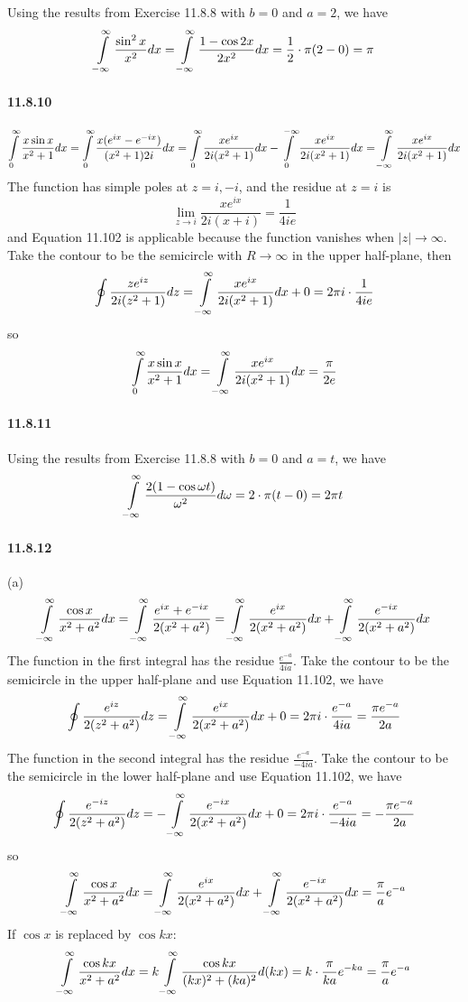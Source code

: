 \documentclass[a4paper]{article}
\begin{document}
Using the results from Exercise 11.8.8 with $b=0$ and $a=2$, we have
\[
\int\displaylimits_{-\infty}^\infty\frac{\sin^2x}{x^2}dx=\int\displaylimits_{-\infty}^\infty\frac{1-\cos2x}{2x^2}dx=\frac{1}{2}\cdot\pi(2-0)=\pi
\]

\paragraph{11.8.10}
\[
\int\displaylimits_0^\infty\frac{x\sin x}{x^2+1}dx=\int\displaylimits_0^\infty\frac{x(e^{ix}-e^{-ix})}{(x^2+1)2i}dx=\int\displaylimits_0^\infty\frac{xe^{ix}}{2i(x^2+1)}dx-\int\displaylimits_0^{-\infty}\frac{xe^{ix}}{2i(x^2+1)}dx=\int\displaylimits_{-\infty}^\infty\frac{xe^{ix}}{2i(x^2+1)}dx
\]
The function has simple poles at $z=i,-i$, and the residue at $z=i$ is
\[
\lim_{z\to i}\frac{xe^{ix}}{2i(x+i)}=\frac{1}{4ie}
\]
and Equation 11.102 is applicable because the function vanishes when $|z|\to\infty$. Take the contour to be the semicircle with $R\to\infty$ in the upper half-plane, then
\[
\oint\frac{ze^{iz}}{2i(z^2+1)}dz=\int\displaylimits_{-\infty}^\infty\frac{xe^{ix}}{2i(x^2+1)}dx+0=2\pi i\cdot\frac{1}{4ie}
\]
so
\[
\int\displaylimits_0^\infty\frac{x\sin x}{x^2+1}dx=\int\displaylimits_{-\infty}^\infty\frac{xe^{ix}}{2i(x^2+1)}dx=\frac{\pi}{2e}
\]

\paragraph{11.8.11}
Using the results from Exercise 11.8.8 with $b=0$ and $a=t$, we have
\[
\int\displaylimits_{-\infty}^\infty\frac{2(1-\cos\omega t)}{\omega^2}d\omega=2\cdot\pi(t-0)=2\pi t
\]

\paragraph{11.8.12}
(a)
\[
\int\displaylimits_{-\infty}^\infty\frac{\cos x}{x^2+a^2}dx=\int\displaylimits_{-\infty}^\infty\frac{e^{ix}+e^{-ix}}{2(x^2+a^2)}=\int\displaylimits_{-\infty}^\infty\frac{e^{ix}}{2(x^2+a^2)}dx+\int\displaylimits_{-\infty}^\infty\frac{e^{-ix}}{2(x^2+a^2)}dx
\]
The function in the first integral has the residue $\frac{e^{-a}}{4ia}$. Take the contour to be the semicircle in the upper half-plane and use Equation 11.102, we have
\[
\oint\frac{e^{iz}}{2(z^2+a^2)}dz=\int\displaylimits_{-\infty}^\infty\frac{e^{ix}}{2(x^2+a^2)}dx+0=2\pi i\cdot\frac{e^{-a}}{4ia}=\frac{\pi e^{-a}}{2a}
\]
The function in the second integral has the residue $\frac{e^{-a}}{-4ia}$. Take the contour to be the semicircle in the lower half-plane and use Equation 11.102, we have
\[
\oint\frac{e^{-iz}}{2(z^2+a^2)}dz=-\int\displaylimits_{-\infty}^\infty\frac{e^{-ix}}{2(x^2+a^2)}dx+0=2\pi i\cdot\frac{e^{-a}}{-4ia}=-\frac{\pi e^{-a}}{2a}
\]
so
\[
\int\displaylimits_{-\infty}^\infty\frac{\cos x}{x^2+a^2}dx=\int\displaylimits_{-\infty}^\infty\frac{e^{ix}}{2(x^2+a^2)}dx+\int\displaylimits_{-\infty}^\infty\frac{e^{-ix}}{2(x^2+a^2)}dx=\frac{\pi}{a}e^{-a}
\]
If $\cos x$ is replaced by $\cos kx$:
\[
\int\displaylimits_{-\infty}^\infty\frac{\cos kx}{x^2+a^2}dx=k\int\displaylimits_{-\infty}^\infty\frac{\cos kx}{(kx)^2+(ka)^2}d(kx)=k\cdot\frac{\pi}{ka}e^{-ka}=\frac{\pi}{a}e^{-a}
\]
\end{document}

